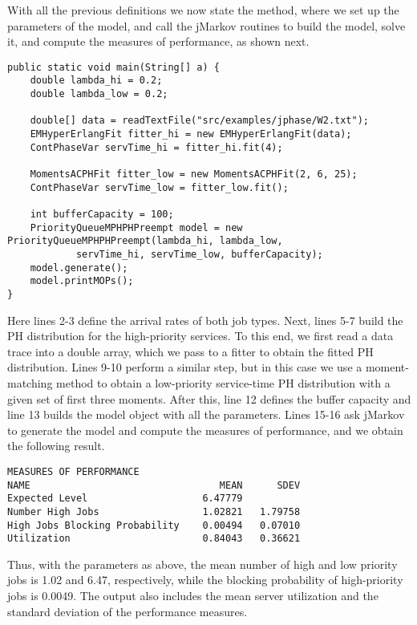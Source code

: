 With all the previous definitions we now state the  method, where
we set up the parameters of the model, and call the jMarkov routines to build
the model, solve it, and compute the measures of performance, as shown next.
\begin{lstlisting}
public static void main(String[] a) {
	double lambda_hi = 0.2;
	double lambda_low = 0.2;

	double[] data = readTextFile("src/examples/jphase/W2.txt");
	EMHyperErlangFit fitter_hi = new EMHyperErlangFit(data);
	ContPhaseVar servTime_hi = fitter_hi.fit(4);

	MomentsACPHFit fitter_low = new MomentsACPHFit(2, 6, 25);
	ContPhaseVar servTime_low = fitter_low.fit();
			
	int bufferCapacity = 100;
	PriorityQueueMPHPHPreempt model = new PriorityQueueMPHPHPreempt(lambda_hi, lambda_low, 
			servTime_hi, servTime_low, bufferCapacity);
	model.generate();
	model.printMOPs();
}
\end{lstlisting}
Here lines 2-3 define the arrival rates of both job types. Next, lines 5-7
build the PH distribution for the high-priority services. To this end, we first
read a data trace into a double array, which we pass to a \jPhase
{} fitter to obtain the fitted PH distribution. Lines
9-10 perform a similar step, but in this case we use a moment-matching method to
obtain a low-priority service-time PH distribution with a given set of first
three moments. After this, line 12 defines the buffer capacity and line 13
builds the model object with all the parameters. Lines 15-16 ask jMarkov to
generate the model and compute the measures of performance, and we obtain the
following result.
\begin{lstlisting}
MEASURES OF PERFORMANCE
NAME                                 MEAN      SDEV
Expected Level                    6.47779
Number High Jobs                  1.02821   1.79758
High Jobs Blocking Probability    0.00494   0.07010
Utilization                       0.84043   0.36621
\end{lstlisting}
Thus, with the parameters as above, the mean number of high and low priority
jobs is 1.02 and 6.47, respectively, while the blocking probability of
high-priority jobs is 0.0049. The output also includes the mean server
utilization and the standard deviation of the performance measures.


